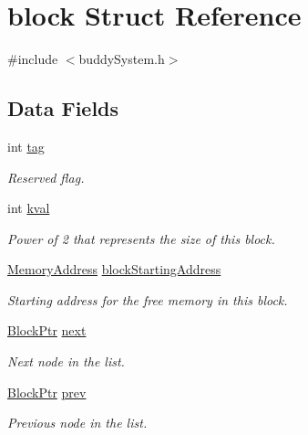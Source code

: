 \hypertarget{structblock}{
\section{block Struct Reference}
\label{structblock}
}


{\ttfamily \#include $<$buddySystem.h$>$}

\subsection*{Data Fields}
\begin{Indent}{\bf }\par
{\em \label{_amgrpd41d8cd98f00b204e9800998ecf8427e}
 }\begin{DoxyCompactItemize}
\item 
int \hyperlink{structblock_a1fb02e310e6b4ef6f7a273c68d77f2c5}{tag}
\begin{DoxyCompactList}\small\item\em Reserved flag. \item\end{DoxyCompactList}\item 
int \hyperlink{structblock_a777d6e8dc19e0d7e22a427beddc1bf33}{kval}
\begin{DoxyCompactList}\small\item\em Power of 2 that represents the size of this block. \item\end{DoxyCompactList}\item 
\hyperlink{buddySystem_8h_a15852e7ed251e60a05550eb9d1c49b82}{MemoryAddress} \hyperlink{structblock_afd27ab0eef51c6215d80a88e6d8780fb}{blockStartingAddress}
\begin{DoxyCompactList}\small\item\em Starting address for the free memory in this block. \item\end{DoxyCompactList}\item 
\hyperlink{structblock}{BlockPtr} \hyperlink{structblock_ad58cc5ebb0e89cbc0d9ebe30e5c6486f}{next}
\begin{DoxyCompactList}\small\item\em Next node in the list. \item\end{DoxyCompactList}\item 
\hyperlink{structblock}{BlockPtr} \hyperlink{structblock_a70aa184bc80f3228d4ee797bbb07359a}{prev}
\begin{DoxyCompactList}\small\item\em Previous node in the list. \item\end{DoxyCompactList}\end{DoxyCompactItemize}
\end{Indent}


